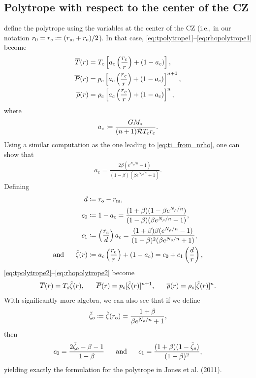 \documentclass[12pt]{article} %
\newcommand{\rrm}{r_{\rm{m}}}
\newcommand{\tz}{\tilde{\zeta}}
\begin{document}
\subsection{Polytrope with respect to the center of the CZ}
\citet{Jones11} define the polytrope using the variables at the center of the CZ (i.e., in our notation $r_0=r_c\coloneqq(\rrm+r_{\rm{o}})/2$). In that case, \eqref{eq:tpolytrope1}--\eqref{eq:rhopolytrope1} become
\begin{align}
	\overline{T}(r) &= T_c\left[a_c\left(\frac{r_c}{r}\right) + (1 - a_c)\right],\label{eq:tpolytrope2}\\
	\overline{P}(r) &= p_c\left[a_c\left(\frac{r_c}{r}\right) + (1 - a_c)\right]^{n+1},\label{eq:ppolytrope2}\\
	\overline{\rho}(r) &= \rho_c\left[a_c\left(\frac{r_c}{r}\right) + (1 - a_c)\right]^n,\label{eq:rhopolytrope2}
\end{align} 
where 
\begin{align}
a_c \coloneqq \frac{GM_*}{(n+1)\mathcal{R} T_c r_c}.
\label{def:ac}
\end{align}
Using a similar computation as the one leading to \eqref{eq:ti_from_nrho}, one can show that 
\begin{align}
a_c = \frac{2\beta(e^{N_\rho/n}-1)}{(1-\beta)(\beta e^{N_\rho/n} + 1)}.
\label{eq:ac_fromn}
\end{align}
Defining 
\begin{align}
d&\coloneqq r_{\rm{o}}-\rrm,\label{def:d}\\
c_0&\coloneqq 1-a_c = \frac{(1+\beta)(1-\beta e^{N_\rho/n})}{(1-\beta)(\beta e^{N_\rho/n} + 1)}, \label{def:c0}\\
c_1&\coloneqq \left(\frac{r_c}{d}\right)a_c = \frac{(1+\beta)\beta(e^{N_\rho/n}-1)}{(1-\beta)^2(\beta e^{N_\rho/n} + 1)},\label{def:c1}\\
\andd \tz(r) &\coloneqq a_c\left(\frac{r_c}{r}\right) + (1-a_c) = c_0 + c_1\left(\frac{d}{r}\right),\label{def:tildezeta}
\end{align}
\eqref{eq:tpolytrope2}--\eqref{eq:rhopolytrope2} become
\begin{align}
\tmpref\ofr=T_c\tz(r),\ \ \ \ \ \prsref\ofr=p_c[\tz(r)]^{n+1},\ \ \ \ \ \rhoref\ofr=\rho_c[\tz(r)]^n. 
\label{eq:polytrope3}
\end{align}
With significantly more algebra, we can also see that if we define
\begin{align}
\tz_o \coloneqq \tz(r_{\rm{o}}) = \frac{1+\beta}{\beta e^{N_\rho/n} + 1}, 
\end{align}
then 
\begin{align}
c_0 = \frac{2\tz_o - \beta - 1}{1-\beta} \ \ \ \ \ \andd c_1 = \frac{(1+\beta)(1-\tz_o)}{(1-\beta)^2},
\label{eq:c01_from_zeta0}
\end{align}
yielding exactly the formulation for the polytrope in Jones et al. (2011). 
\end{document}
